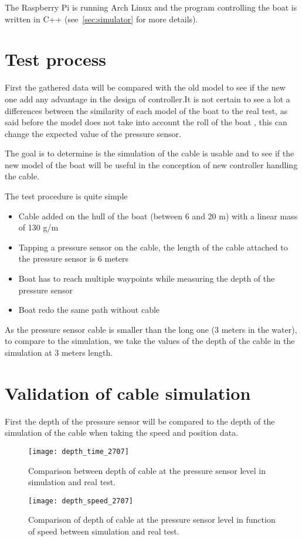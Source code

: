 The Raspberry Pi is running Arch Linux and the program controlling the boat is written in C++ (see~\ref{sec:simulator} for more details).

\section{Test process}

First the gathered data will be compared with the old model to see if the new one add any advantage in the design of controller.It is not certain to see a lot a differences between the similarity of each model of the boat to the real test, as said before the model does not take into account the roll of the boat , this can change the expected value of the pressure sensor.

 The goal is to determine is the simulation of the cable is usable and to see if the new model of the boat will be useful in the conception of new controller handling the cable. 
 
 The test procedure is quite simple
 
\begin{itemize}
\item Cable added on the hull of the boat (between 6 and 20 m) with a linear mass of 130 g/m
\item Tapping a pressure sensor on the cable, the length of the cable attached to the pressure sensor is 6 meters
\item Boat has to reach multiple waypoints while measuring the depth of the pressure sensor
\item Boat redo the same path without cable
\end{itemize}

As the pressure sensor cable is smaller than the long one (3 meters in the water), to compare to the simulation, we take the values of the depth of the cable in the simulation at 3 meters length.

\section{Validation of cable simulation}

First the depth of the pressure sensor will be compared to the depth of the simulation of the cable when taking the speed and position data.

\begin{figure}[H]
\centering
    \begin{minipage}[b]{0.4\textwidth}
    \centering
    \texttt{[image: depth\_time\_2707]}
    \caption{Comparison between depth of cable at the pressure sensor level in simulation and real test.}
    \label{fig:comp_depth_time_2007}
    \end{minipage}
    \hfill
    \begin{minipage}[b]{0.45\textwidth}
    \centering
    \texttt{[image: depth\_speed\_2707]}
    \caption{Comparison of depth of cable at the pressure sensor level in function of speed between simulation and real test.}
    \label{fig:comp_depth_speed_2007}
    \end{minipage}
\end{figure}

